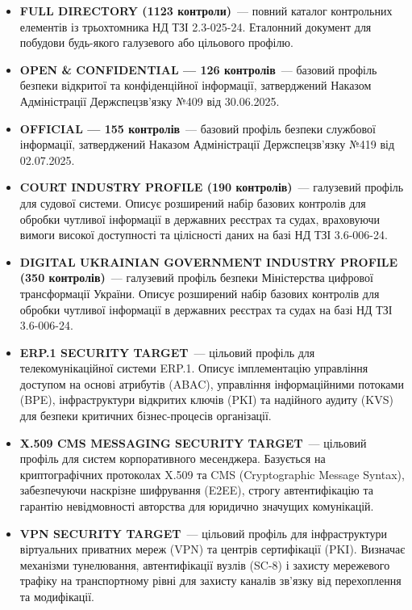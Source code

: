 \begin{itemize}
    \item \textbf{FULL DIRECTORY (1123 контроли)}~--- повний каталог контрольних елементів
          із трьохтомника НД ТЗІ 2.3-025-24. Еталонний документ для побудови будь-якого
          галузевого або цільового профілю.

    \item \textbf{OPEN \& CONFIDENTIAL --- 126 контролів}~--- базовий профіль безпеки відкритої
          та конфіденційної інформації, затверджений Наказом Адміністрації Держспецзв'язку №409
          від 30.06.2025.

    \item \textbf{OFFICIAL --- 155 контролів}~--- базовий профіль безпеки службової інформації,
          затверджений Наказом Адміністрації Держспецзв'язку №419 від 02.07.2025.

    \item \textbf{COURT INDUSTRY PROFILE (190 контролів)}~--- галузевий профіль для судової
          системи. Описує розширений набір базових контролів для обробки чутливої інформації в
          державних реєстрах та судах, враховуючи вимоги високої доступності та цілісності даних
          на базі НД ТЗІ 3.6-006-24.

    \item \textbf{DIGITAL UKRAINIAN GOVERNMENT INDUSTRY PROFILE (350 контролів)}~---
          галузевий профіль безпеки Міністерства цифрової трансформації України. Описує
          розширений набір базових контролів для обробки чутливої інформації в державних реєстрах
          та судах на базі НД ТЗІ 3.6-006-24.

    \item \textbf{ERP.1 SECURITY TARGET}~--- цільовий профіль для телекомунікаційної системи
          ERP.1. Описує імплементацію управління доступом на основі атрибутів (ABAC), управління
          інформаційними потоками (BPE), інфраструктури відкритих ключів (PKI) та надійного
          аудиту (KVS) для безпеки критичних бізнес-процесів організації.

    \item \textbf{X.509 CMS MESSAGING SECURITY TARGET}~--- цільовий профіль для систем
          корпоративного месенджера. Базується на криптографічних протоколах X.509 та CMS
          (Cryptographic Message Syntax), забезпечуючи наскрізне шифрування (E2EE), строгу
          автентифікацію та гарантію невідмовності авторства для юридично значущих комунікацій.

    \item \textbf{VPN SECURITY TARGET}~--- цільовий профіль для інфраструктури віртуальних
          приватних мереж (VPN) та центрів сертифікації (PKI). Визначає механізми тунелювання,
          автентифікації вузлів (SC-8) і захисту мережевого трафіку на транспортному рівні для
          захисту каналів зв'язку від перехоплення та модифікації.
\end{itemize}


